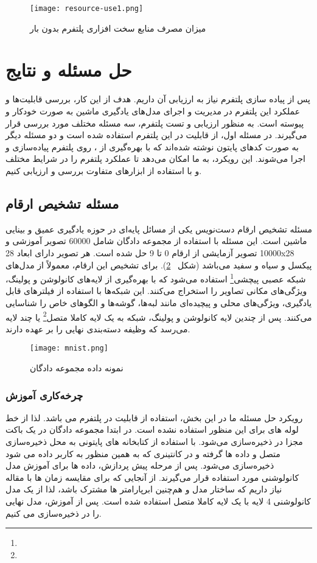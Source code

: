 \begin{figure}[!b]
	\centering
	\texttt{[image: resource-use1.png]}
	\caption{میزان مصرف منابع سخت افزاری پلتفرم بدون بار}
	\label{fig: resource use no load}
\end{figure}
\clearpage
\section{حل مسئله و نتایج}
 
پس از پیاده سازی پلتفرم  نیاز به ارزیابی آن داریم. هدف از این کار، بررسی قابلیت‌ها و عملکرد این پلتفرم در مدیریت و اجرای مدل‌های یادگیری ماشین به صورت خودکار و پیوسته است. به منظور ارزیابی و تست پلتفرم، سه مسئله مختلف مورد بررسی قرار می‌گیرند. در مسئله اول، از قابلیت  در این پلتفرم استفاده شده است و دو مسئله دیگر به صورت کدهای پایتون نوشته شده‌اند که با بهره‌گیری از ، روی پلتفرم پیاده‌سازی و اجرا می‌شوند. این رویکرد، به ما امکان می‌دهد تا عملکرد پلتفرم را در شرایط مختلف و با استفاده از ابزارهای متفاوت بررسی و ارزیابی کنیم.

\subsection{مسئله تشخیص ارقام}
مسئله تشخیص ارقام دست‌نویس یکی از مسائل پایه‌ای در حوزه یادگیری عمیق و بینایی ماشین است. این مسئله با استفاده از مجموعه دادگان  شامل 60000 تصویر آموزشی و 10000 تصویر آزمایشی از ارقام 0 تا 9 حل شده است. هر تصویر دارای ابعاد 28x28 پیکسل و سیاه و سفید می‌باشد (شکل ~\ref{fig: mnist}). برای تشخیص این ارقام، معمولاً از مدل‌های شبکه عصبی پیچشی\footnote{} استفاده می‌شود که با بهره‌گیری از لایه‌های کانولوشن و پولینگ، ویژگی‌های مکانی تصاویر را استخراج می‌کنند. این شبکه‌ها با استفاده از فیلترهای قابل یادگیری، ویژگی‌های محلی و پیچیده‌ای مانند لبه‌ها، گوشه‌ها و الگوهای خاص را شناسایی می‌کنند. پس از چندین لایه کانولوشن و پولینگ، شبکه به یک لایه کاملا متصل\footnote{} یا چند لایه می‌رسد که وظیفه دسته‌بندی نهایی را بر عهده دارند. 

\begin{figure}[t]
	\centering
	\texttt{[image: mnist.png]}
	\caption{نمونه داده مجموعه دادگان }
	\label{fig: mnist}
\end{figure}

\subsubsection{چرخه‌کاری آموزش}
رویکرد حل مسئله ما در این بخش،‌ استفاده از قابلیت  در پلتفرم می باشد. لذا از خط لوله های  برای این منظور استفاده نشده است. در ابتدا مجموعه دادگان  در یک باکت مجزا در  ذخیره‌سازی می‌شود. با استفاده از کتابخانه های پایتونی به محل ذخیره‌سازی متصل و داده ها گرفته و در کانتینری که به همین منظور به کاربر داده می شود ذخیره‌سازی می‌شود. پس از مرحله پیش پردازش، داده ها برای آموزش مدل کانولوشنی مورد استفاده قرار می‌گیرند. از آنجایی که برای مقایسه زمان ها با مقاله \cite{kubeflowdeploycload} نیاز داریم که ساختار مدل و هم‌چنین ابرپارامتر ها مشترک باشد، لذا از یک مدل کانولوشنی 4 لایه با یک لایه کاملا متصل استفاده شده است. پس از آموزش، مدل نهایی را در  ذخیره‌سازی می کنیم. 
